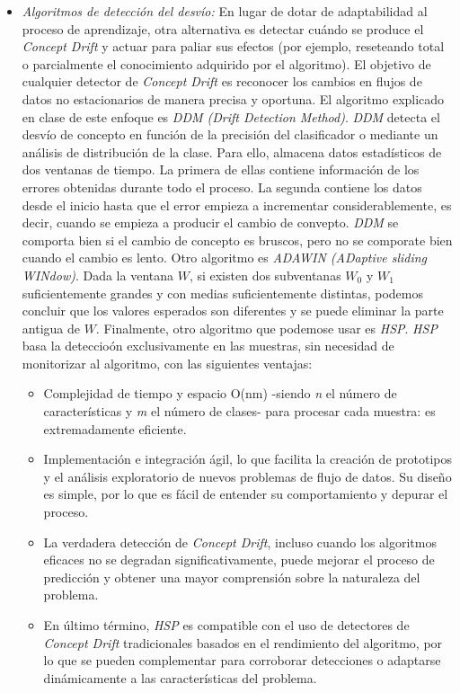 \documentclass[11pt]{article}
\begin{document}
\begin{itemize}
	\item \textit{Algoritmos de detección del desvío:} En lugar de dotar de adaptabilidad al proceso de aprendizaje, otra alternativa es detectar cuándo se produce el \textit{Concept Drift} y actuar para paliar sus efectos (por ejemplo, reseteando total o parcialmente el conocimiento adquirido por el algoritmo). El objetivo de cualquier detector de \textit{Concept Drift} es reconocer los cambios en flujos de datos no estacionarios de manera precisa y oportuna. El algoritmo explicado en clase de este enfoque es \textit{DDM (Drift Detection Method)}. \textit{DDM} detecta el desvío de concepto en función de la precisión del clasificador o mediante un análisis de distribución de la clase. Para ello, almacena datos estadísticos de dos ventanas de tiempo. La primera de ellas contiene información de los errores obtenidas durante todo el proceso. La segunda contiene los datos desde el inicio hasta que el error empieza a incrementar considerablemente, es decir, cuando se empieza a producir el cambio de convepto. \textit{DDM} se comporta bien si el cambio de concepto es bruscos, pero no se comporate bien cuando el cambio es lento. Otro algoritmo es \textit{ADAWIN (ADaptive sliding WINdow)}. Dada la ventana $W$, si existen dos subventanas $W_0$ y $W_1$ suficientemente grandes y con medias suficientemente distintas, podemos concluir que los valores esperados son diferentes y se puede eliminar la parte antigua de $W$. Finalmente, otro algoritmo que podemose usar es \textit{HSP}. \textit{HSP} basa la deteccioón exclusivamente en las muestras, sin necesidad de monitorizar al algoritmo, con las siguientes ventajas:
	\begin{itemize}
		\item Complejidad de tiempo y espacio O(nm) -siendo \textit{n} el número de características y \textit{m} el número de clases- para procesar cada muestra: es extremadamente eficiente.
		\item Implementación e integración ágil, lo que facilita la creación de prototipos y el análisis exploratorio de nuevos problemas de flujo de datos. Su diseño es simple, por lo que es fácil de entender su comportamiento y depurar el proceso.
		\item La verdadera detección de \textit{Concept Drift}, incluso cuando los algoritmos eficaces no se degradan significativamente, puede mejorar el proceso de predicción y obtener una mayor comprensión sobre la naturaleza del problema.
		\item En último término, \textit{HSP} es compatible con el uso de detectores de \textit{Concept Drift} tradicionales basados en el rendimiento del algoritmo, por lo que se pueden complementar para corroborar detecciones o adaptarse dinámicamente a las características del problema.
	\end{itemize}
\end{itemize}
\end{document}
